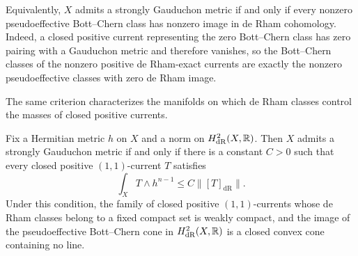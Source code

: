 Equivalently, $X$ admits a strongly Gauduchon metric if and only if every nonzero pseudoeffective Bott--Chern class has nonzero image in de Rham cohomology. Indeed, a closed positive current representing the zero Bott--Chern class has zero pairing with a Gauduchon metric and therefore vanishes, so the Bott--Chern classes of the nonzero positive de Rham-exact currents are exactly the nonzero pseudoeffective classes with zero de Rham image.

The same criterion characterizes the manifolds on which de Rham classes control the masses of closed positive currents.

\begin{corollary}\label{cor:strong-gauduchon-current-compactness}
Fix a Hermitian metric $h$ on $X$ and a norm on $H^2_{\mathrm{dR}}(X,\mathbb R)$. Then $X$ admits a strongly Gauduchon metric if and only if there is a constant $C>0$ such that every closed positive $(1,1)$-current $T$ satisfies
\begin{equation}\label{eq:strong-gauduchon-class-mass}
 \int_XT\wedge h^{n-1}\leq C\|[T]_{\mathrm{dR}}\|.
\end{equation}
Under this condition, the family of closed positive $(1,1)$-currents whose de Rham classes belong to a fixed compact set is weakly compact, and the image of the pseudoeffective Bott--Chern cone in $H^2_{\mathrm{dR}}(X,\mathbb R)$ is a closed convex cone containing no line.
\end{corollary}
